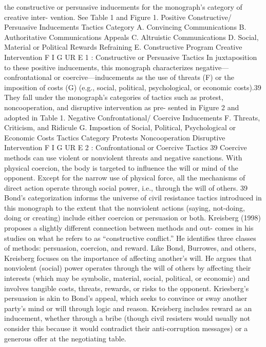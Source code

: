 \documentclass[twoside,a4paper,12pt,fleqn,openany]{extbook}
\begin{document}
the constructive or persuasive inducements for the monograph’s category of creative inter-
vention. See Table 1 and Figure 1.
Positive
Constructive/
Persuasive
Inducements
 Tactics Category
A. Convincing Communications
B. Authoritative Communications
 Appeals
C. Altruistic Communications
D. Social, Material or Political Rewards
 Refraining
E. Constructive Program
 Creative Intervention
F I G UR E 1 : Constructive or Persuasive Tactics
In juxtaposition to these positive inducements, this monograph characterizes negative—
confrontational or coercive—inducements as the use of threats (F) or the imposition of costs
(G) (e.g., social, political, psychological, or economic costs).39 They fall under the monograph’s
categories of tactics such as protest, noncooperation, and disruptive intervention as pre-
sented in Figure 2 and adopted in Table 1.
Negative
Confrontational/
Coercive
Inducements
F. Threats, Criticism, and Ridicule
G. Impostion of Social, Political,
Psychological or Economic Costs
Tactics Category
Protests
Noncooperation
Disruptive
Intervention
F I G UR E 2 : Confrontational or Coercive Tactics
39
Coercive methods can use violent or nonviolent threats and negative sanctions. With physical coercion, the body
is targeted to influence the will or mind of the opponent. Except for the narrow use of physical force, all the
mechanisms of direct action operate through social power, i.e., through the will of others.
39
Bond’s categorization informs the universe of civil resistance tactics introduced in this
monograph to the extent that the nonviolent actions (saying, not-doing, doing or creating)
include either coercion or persuasion or both.
Kreisberg (1998) proposes a slightly different connection between methods and out-
comes in his studies on what he refers to as “constructive conflict.” He identifies three
classes of methods: persuasion, coercion, and reward. Like Bond, Burrowes, and others,
Kreisberg focuses on the importance of affecting another’s will. He argues that nonviolent
(social) power operates through the will of others by affecting their interests (which may
be symbolic, material, social, political, or economic) and involves tangible costs, threats,
rewards, or risks to the opponent. Kriesberg’s persuasion is akin to Bond’s appeal, which
seeks to convince or sway another party’s mind or will through logic and reason. Kreisberg
includes reward as an inducement, whether through a bribe (though civil resisters would
usually not consider this because it would contradict their anti-corruption messages) or a
generous offer at the negotiating table.
\end{document}
